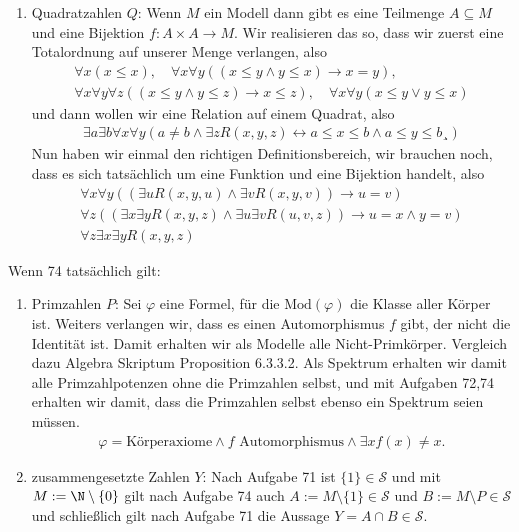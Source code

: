 \begin{solution}
\begin{enumerate}[label = \arabic*.]
		\item Quadratzahlen $Q$: Wenn $M$ ein Modell dann gibt es eine Teilmenge $A \subseteq M$ und eine Bijektion $f: A \times A \to M$. Wir realisieren das so, dass wir zuerst eine Totalordnung auf unserer Menge verlangen, also
		\begin{align*}
		\forall x (x \leq x), \quad \forall x \forall y ((x \leq y \land y \leq x) \rightarrow x = y),\\
		\forall x \forall y \forall z((x \leq y \land y \leq z) \rightarrow x \leq z), \quad \forall x \forall y (x \leq y \lor y \leq x)
		\end{align*}
		und dann wollen wir eine Relation auf einem Quadrat, also
		\begin{align*}
		\exists a \exists b \forall x \forall y(a \neq b \land \exists zR(x,y,z) \leftrightarrow a \leq x \leq b \land a \leq y \leq b¸)
		\end{align*}
		Nun haben wir einmal den richtigen Definitionsbereich, wir brauchen noch, dass es sich tatsächlich um eine Funktion und eine Bijektion handelt, also
		\begin{align*}
		\forall x \forall y((\exists u R(x,y,u) \land \exists v R(x,y,v)) \rightarrow u = v) \\
		\forall z ((\exists x \exists y R(x,y,z) \land \exists u \exists v R(u,v,z)) \rightarrow u = x \land y = v) \\
		\forall z \exists x \exists y R(x,y,z)
		\end{align*}
	\end{enumerate}
Wenn 74 tatsächlich gilt:
\begin{enumerate}
	\item Primzahlen $P$:
	Sei $\varphi$ eine Formel, für die $\mathrm{Mod}(\varphi)$ die Klasse aller Körper ist. Weiters verlangen wir, dass es einen Automorphismus $f$ gibt, der nicht
	die Identität ist. Damit erhalten wir als Modelle alle Nicht-Primkörper. Vergleich dazu Algebra Skriptum Proposition 6.3.3.2. Als Spektrum erhalten wir damit alle Primzahlpotenzen
	ohne die Primzahlen selbst, und mit Aufgaben 72,74 erhalten wir damit, dass
	die Primzahlen selbst ebenso ein Spektrum seien müssen.
	\begin{align*}
		\varphi = \text{Körperaxiome} \land f \text{ Automorphismus} \land \exists x f(x) \neq x.
	\end{align*}
	\item zusammengesetzte Zahlen $Y$:
	Nach Aufgabe 71 ist $\{1\} \in \mathscr{S}$ und mit $M := \N \setminus \{0\}$
	gilt  nach Aufgabe 74 auch $A:= M \setminus \{1\} \in \mathscr{S}$ und
	$B := M \setminus P \in \mathscr{S}$ und schließlich gilt nach Aufgabe 71
	die Aussage $Y = A \cap B \in \mathscr{S}$.
\end{enumerate}
\end{solution}
